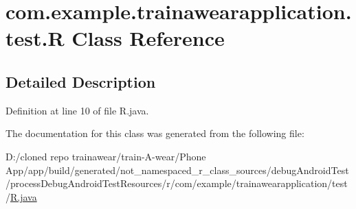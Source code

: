\hypertarget{classcom_1_1example_1_1trainawearapplication_1_1test_1_1_r}{}\section{com.\+example.\+trainawearapplication.\+test.\+R Class Reference}
\label{classcom_1_1example_1_1trainawearapplication_1_1test_1_1_r}


\subsection{Detailed Description}


Definition at line 10 of file R.\+java.



The documentation for this class was generated from the following file\+:\begin{DoxyCompactItemize}
\item 
D\+:/cloned repo trainawear/train-\/\+A-\/wear/\+Phone App/app/build/generated/not\+\_\+namespaced\+\_\+r\+\_\+class\+\_\+sources/debug\+Android\+Test/process\+Debug\+Android\+Test\+Resources/r/com/example/trainawearapplication/test/\mbox{\hyperlink{ndroid_test_2process_debug_android_test_resources_2r_2com_2example_2trainawearapplication_2test_2_r_8java}{R.\+java}}\end{DoxyCompactItemize}
